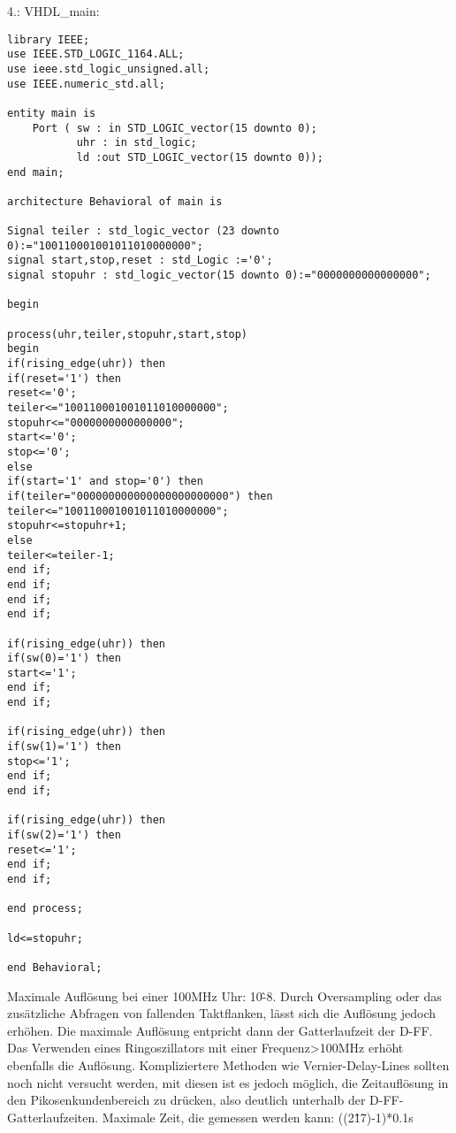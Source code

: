 \documentclass{article}
\begin{document}
4.:\newline
VHDL\_main:\newline
\begin{verbatim}
library IEEE;
use IEEE.STD_LOGIC_1164.ALL;
use ieee.std_logic_unsigned.all;
use IEEE.numeric_std.all;

entity main is
    Port ( sw : in STD_LOGIC_vector(15 downto 0);
           uhr : in std_logic;
           ld :out STD_LOGIC_vector(15 downto 0));
end main;

architecture Behavioral of main is

Signal teiler : std_logic_vector (23 downto 0):="100110001001011010000000";
signal start,stop,reset : std_Logic :='0';
signal stopuhr : std_logic_vector(15 downto 0):="0000000000000000";

begin

process(uhr,teiler,stopuhr,start,stop)
begin
if(rising_edge(uhr)) then
if(reset='1') then
reset<='0';
teiler<="100110001001011010000000";
stopuhr<="0000000000000000";
start<='0';
stop<='0';
else
if(start='1' and stop='0') then
if(teiler="000000000000000000000000") then
teiler<="100110001001011010000000";
stopuhr<=stopuhr+1;
else
teiler<=teiler-1;
end if;
end if;
end if;
end if;

if(rising_edge(uhr)) then
if(sw(0)='1') then
start<='1';
end if;
end if;

if(rising_edge(uhr)) then
if(sw(1)='1') then
stop<='1';
end if;
end if;

if(rising_edge(uhr)) then
if(sw(2)='1') then
reset<='1';
end if;
end if;

end process;

ld<=stopuhr;

end Behavioral;
\end{verbatim}
Maximale Aufl\"osung bei einer 100MHz Uhr: 10\^{-8}.  Durch Oversampling oder das zus\"atzliche Abfragen von fallenden Taktflanken,  l\"asst sich die Aufl\"osung jedoch erh\"ohen. Die maximale Aufl\"osung entpricht dann der Gatterlaufzeit der D-FF. \newline
Das Verwenden eines Ringoszillators mit einer Frequenz>100MHz erh\"oht ebenfalls die Aufl\"osung. Kompliziertere Methoden wie Vernier-Delay-Lines sollten noch nicht versucht werden, mit diesen ist es jedoch m\"oglich, die Zeitaufl\"osung in den Pikosenkundenbereich zu dr\"ucken, also deutlich unterhalb der D-FF-Gatterlaufzeiten.\newline
Maximale Zeit, die gemessen werden kann: ((2\^{17})-1)*0.1s
\end{document}
